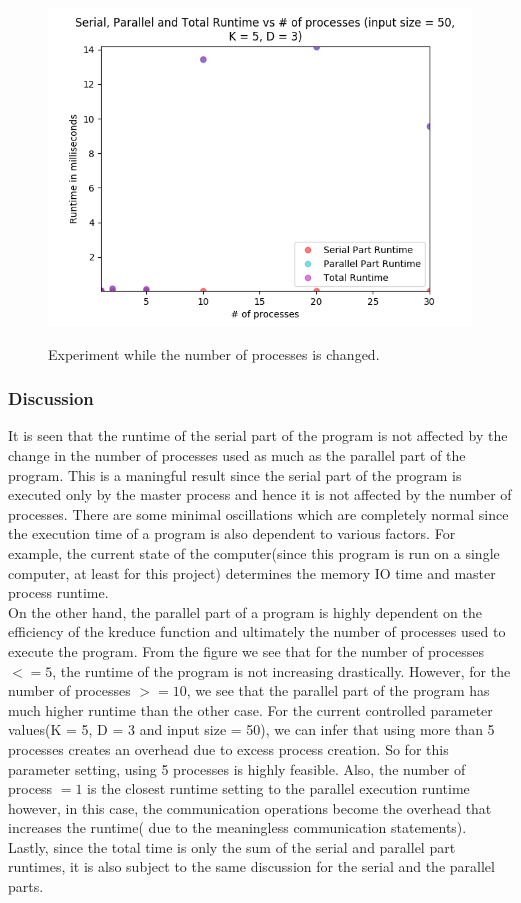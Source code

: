 \documentclass{article}
\begin{document}
\begin{figure}[H]
\centering
\includegraphics[width=\linewidth]{assets/input_size_50_K_5_D_3.png}
\label{fig:test1}
\vspace{-2pt}
\caption{Experiment while the number of processes is changed.}
\end{figure}

\subsubsection{Discussion}
\qquad It is seen that the runtime of the serial part of the program is not affected by the change in the number of processes used as much as the parallel part of the program. This is a maningful result since the serial part of the program is executed only by the master process and hence it is not affected by the number of processes. There are some minimal oscillations which are completely normal since the execution time of a program is also dependent to various factors. For example, the current state of the computer(since this program is run on a single computer, at least for this project) determines the memory IO time and master process runtime.\\
\null \qquad On the other hand, the parallel part of a program is highly dependent on the efficiency of the kreduce function and ultimately the number of processes used to execute the program. From the figure we see that for the number of processes $<= 5$, the runtime of the program is not increasing drastically. However, for the number of processes $>= 10$, we see that the parallel part of the program has much higher runtime than the other case. For the current controlled parameter values(K = 5, D = 3 and input size = 50), we can infer that using more than 5 processes creates an overhead due to excess process creation. So for this parameter setting, using 5 processes is highly feasible. Also, the number of process $ = 1 $ is the closest runtime setting to the parallel execution runtime however, in this case, the communication operations become the overhead that increases the runtime( due to the meaningless communication statements).\\
\null \qquad Lastly, since the total time is only the sum of the serial and parallel part runtimes, it is also subject to the same discussion for the serial and the parallel parts.
\end{document}
